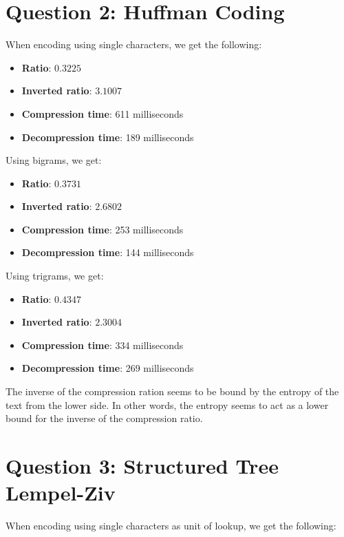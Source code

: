 \documentclass[fleqn]{article}
\begin{document}
\clearpage

\section{Question 2: Huffman Coding}

When encoding using single characters, we get the following:

\begin{itemize}
  \item \textbf{Ratio}: $0.3225$
  \item \textbf{Inverted ratio}: $3.1007$
  \item \textbf{Compression time}: 611 milliseconds
  \item \textbf{Decompression time}: 189 milliseconds
\end{itemize}

Using bigrams, we get:

\begin{itemize}
  \item \textbf{Ratio}: $0.3731$
  \item \textbf{Inverted ratio}: $2.6802$
  \item \textbf{Compression time}: 253 milliseconds
  \item \textbf{Decompression time}: 144 milliseconds
\end{itemize}

Using trigrams, we get:

\begin{itemize}
  \item \textbf{Ratio}: $0.4347$
  \item \textbf{Inverted ratio}: $2.3004$
  \item \textbf{Compression time}: 334 milliseconds
  \item \textbf{Decompression time}: 269 milliseconds
\end{itemize}

The inverse of the compression ration seems to be bound by the entropy of the
text from the lower side. In other words, the entropy seems to act as a lower
bound for the inverse of the compression ratio.

\section{Question 3: Structured Tree Lempel-Ziv}

When encoding using single characters as unit of lookup, we get the following:
\end{document}
